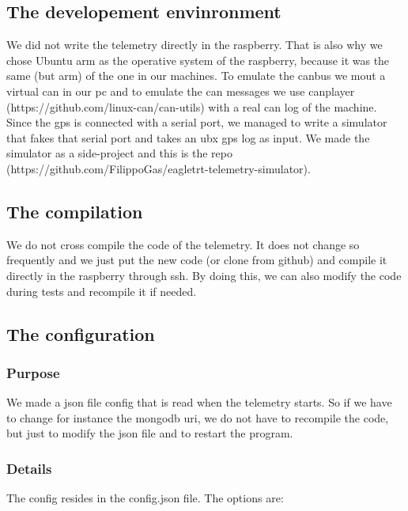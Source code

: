 \subsection{The developement envinronment}

We did not write the telemetry directly in the raspberry. That is also why we chose Ubuntu arm as the operative system of the raspberry, because
it was the same (but arm) of the one in our machines. To emulate the canbus we mout a virtual can in our pc and to emulate the can messages we
use canplayer (https://github.com/linux-can/can-utils) with a real can log of the machine. Since the gps is connected with a serial port, we 
managed to write a simulator that fakes that serial port and takes an ubx gps log as input. We made the simulator as a side-project and this
is the repo (https://github.com/FilippoGas/eagletrt-telemetry-simulator).

\subsection{The compilation}

We do not cross compile the code of the telemetry. It does not change so frequently and we just put the new code (or clone from github) and compile
it directly in the raspberry through ssh. By doing this, we can also modify the code during tests and recompile it if needed.

\subsection{The configuration}

\subsubsection{Purpose}

We made a json file config that is read when the telemetry starts. So if we have to change for instance the mongodb uri, 
we do not have to recompile the code, but just to modify the json file and to restart the program.

\subsubsection{Details}

The config resides in the config.json file. The options are:

